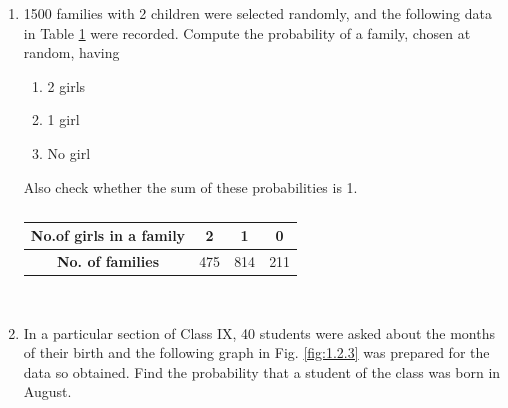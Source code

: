 \begin{enumerate}[label=\thesection.\arabic*.,ref=\thesection.\theenumi]
\begin{table}[!ht]
\centering
{}
\caption{}
\label{table:prob_exam10}
\end{table}
\solution

    \item 1500 families with 2 children were selected randomly, and the following data in Table \ref{table:1.2.2} were recorded.
Compute the probability of a family, chosen at random, having
\begin{enumerate}
\item 2 girls
\item  1 girl
\item  No girl
\end{enumerate}
Also check whether the sum of these probabilities is 1.
\begin{table}[!ht]
\centering
\begin{tabular}{ |c|c|c|c| } 
 \hline
 \textbf{No.of girls in a family} &2 &1 &0\\ 
 \hline
 \textbf{No. of families}  &475 &814 &211\\ 
 \hline 
\end{tabular}
\caption{}
\label{table:1.2.2}
\end{table}
\\
\solution


\item In a particular section of Class IX, 40 students were asked about the months of their birth and the following graph in Fig. \ref{fig:1.2.3}
was prepared for the data so obtained.     Find the probability that a student of the class was born in August.

    
\solution



\end{enumerate}
